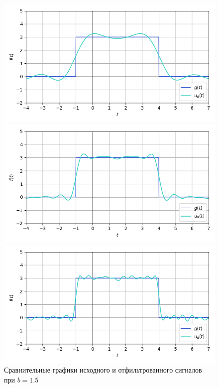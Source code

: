 \documentclass[a4paper]{article}
\begin{document}
\begin{figure}[H]
    \begin{minipage}{0.33\textwidth}
        \centering \includegraphics[width=\textwidth]{sources/low-pass filter/denoised (b=1.5, v=3).png}
        \caption{$v = 3$}
    \end{minipage}\hfill
    \begin{minipage}{0.33\textwidth}
        \centering \includegraphics[width=\textwidth]{sources/low-pass filter/denoised (b=1.5, v=7).png}
        \caption{$v = 7$}
    \end{minipage}\hfill
    \begin{minipage}{0.33\textwidth}
        \centering \includegraphics[width=\textwidth]{sources/low-pass filter/denoised (b=1.5, v=13).png}
        \caption{$v = 13$}
    \end{minipage}
    \caption*{Сравнительные графики исходного и отфильтрованного сигналов при $b=1.5$}
\end{figure}
\end{document}
